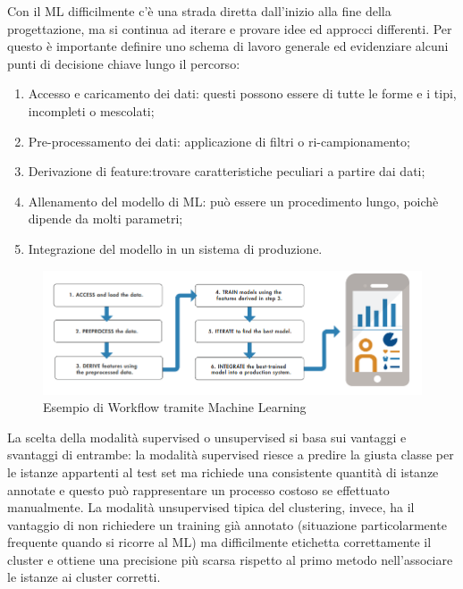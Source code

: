 Con il ML difficilmente c'è una strada diretta dall'inizio alla fine della progettazione, ma si continua ad iterare e provare idee ed approcci differenti. Per questo è importante definire uno schema di lavoro generale ed evidenziare alcuni punti di decisione chiave lungo il percorso:
\begin{enumerate}
	\item Accesso e caricamento dei dati: questi possono essere di tutte le forme e i tipi, incompleti o mescolati;
	\item Pre-processamento dei dati: applicazione di filtri o ri-campionamento;
	\item Derivazione di feature:trovare caratteristiche peculiari a partire dai dati;
	\item Allenamento del modello di ML: può essere un procedimento lungo, poichè dipende da molti parametri;
	\item Integrazione del modello in un sistema di produzione.
\end{enumerate}
\begin{figure}[]
	\centering
	\includegraphics[scale=0.8]{images/Workflow_ML.png}
	\caption{Esempio di Workflow tramite Machine Learning}
\end{figure}
La scelta della modalità supervised o unsupervised si basa sui vantaggi e svantaggi
di entrambe: la modalità supervised riesce a predire la giusta classe per le istanze
appartenti al test set ma richiede una consistente quantità di istanze annotate e
questo può rappresentare un processo costoso se effettuato manualmente.
La modalità unsupervised tipica del clustering, invece, ha il vantaggio di non
richiedere un training già annotato (situazione particolarmente frequente quando si
ricorre al ML) ma difficilmente etichetta correttamente il cluster e ottiene una
precisione più scarsa rispetto al primo metodo nell'associare le istanze ai cluster
corretti. 

